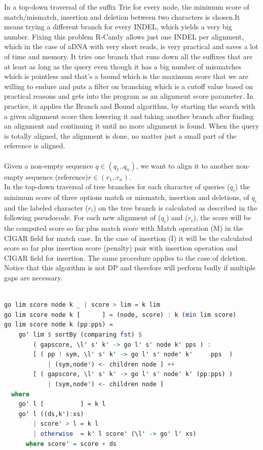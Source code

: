\documentclass[11pt,a4paper]{report}
\begin{document}
In a top-down traversal of the suffix Trie for every node, the 
minimum score of match$/$mismatch, insertion and deletion between
two characters is chosen.It means trying a different branch for 
every INDEL, which yields a very big number. Fixing this problem 
R-Candy allows just one INDEL per alignment, which in the case
of aDNA with very short reads, is very practical and saves a lot of
time and memory. It tries one branch that runs down all the suffixes
that are at least as long as the query even though it has a big 
number of mismatches which is pointless and that's a bound which is
the maximum score that we are willing to endure and puts a filter on
branching which is a cutoff value based on practical reasons and gets
into the program as an alignment score parameter. 
In practice, it applies the Branch and Bound algorithm, by starting the 
search  with a given alignment score then lowering it and taking another 
branch after finding an alignment and continuing it until no more 
alignment is found. When the query is totally aligned, the alignment is 
done, no matter just a small part of the reference is aligned.
\\\\
Given a non-empty sequence $q\in (q_{1}..q_{n})$, we want to align it to 
another non-empty sequence (reference)$r\in (r_{1}..r_{n})$.\\
In the top-down traversal of tree branches for each character 
of queries ($q_{i}$) the minimum score of three options match or mismatch, 
insertion and deletions, of $q_{i}$  and the labeled character ($r_{i}$)
on the tree branch is calculated as described in the following pseudocode.
For each new alignment of ($q_{i}$) and ($r_{i}$), the score will be the
computed score so far plus match score with Match operation (M) in the 
CIGAR field \cite{samtools} for match case. In the case of insertion (I) 
it will be the calculated score so far plus insertion score (penalty) pair 
with insertion operation and CIGAR field for insertion.
The same procedure applies to the case of deletion.
Notice that this algorithm is not DP and therefore will
perform badly if multiple gaps are necessary.\\


\begin{lstlisting}[language=Haskell, basicstyle=\ttfamily\scriptsize, 
keywordstyle=\color{red}, frame=single ]

go lim score node k _ | score > lim = k lim
go lim score node k [      ] = (node, score) : k (min lim score)
go lim score node k (pp:pps) =
    go' lim $ sortBy (comparing fst) $
        ( gapscore, \l' s' k' -> go l' s' node k' pps ) :                   
        [ ( pp ! sym, \l' s' k' -> go l' s' node' k'     pps  )
            | (sym,node') <- children node ] ++
        [ ( gapscore, \l' s' k' -> go l' s' node' k' (pp:pps) ) 
            | (sym,node') <- children node ]
  where
    go' l [          ] = k l
    go' l ((ds,k'):xs)
        | score' > l = k l               
        | otherwise  = k' l score' (\l' -> go' l' xs)
      where score' = score + ds

\end{lstlisting}
\end{document}
